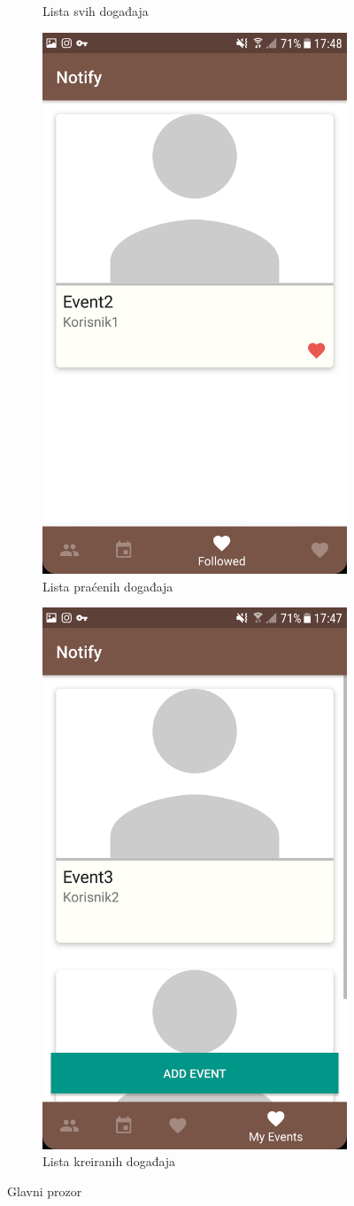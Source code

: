 \documentclass[times, utf8, zavrsni]{fer}
\begin{document}
\begin{figure}
\begin{subfigure}{0.5\linewidth}
    \caption{Lista svih događaja}
    \label{fig:event-list-all-image}
\end{subfigure}
\begin{subfigure}{0.5\linewidth}
	\centering    
    \includegraphics[width=0.45\linewidth]{img/ss-event-list-followed.png} 
    \caption{Lista praćenih događaja}
    \label{fig:event-list-followed-image}
\end{subfigure}%
\begin{subfigure}{0.5\linewidth}
	\centering
    \includegraphics[width=0.45\linewidth]{img/ss-event-list-my.png} 
    \caption{Lista kreiranih događaja}
    \label{fig:event-list-my-image}
\end{subfigure}%
\caption{Glavni prozor}
\label{fig:main-activity-image}
\end{figure}
\end{document}
